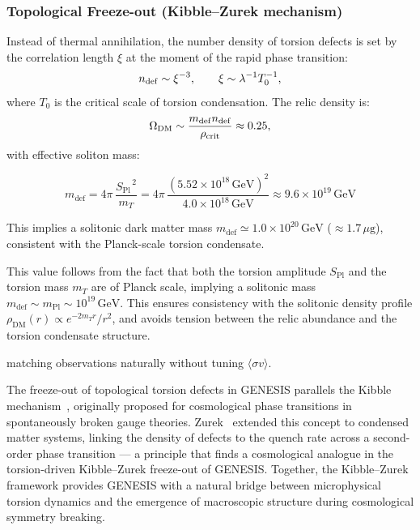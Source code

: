 \documentclass{article}
\newcommand{\Splanck}{\ensuremath{S_{\mathrm{Pl}}}}
\begin{document}
\subsubsection{Topological Freeze-out (Kibble–Zurek mechanism)}
\label{app:kibble-zurek}

Instead of thermal annihilation, the number density of torsion defects is set by the correlation length $\xi$ at the moment of the rapid phase transition:
\begin{equation}
  n_{\rm def} \sim \xi^{-3},
  \qquad
  \xi \sim \lambda^{-1} T_0^{-1},
\end{equation}
where $T_0$ is the critical scale of torsion condensation. The relic density is:
\begin{equation}
  \Omega_{\rm DM} \sim \frac{m_{\rm def} n_{\rm def}}{\rho_{\rm crit}}
  \approx 0.25,
\end{equation}
with effective soliton mass:


\begin{equation}
m_{\text{def}} = 4\pi\,\frac{\Splanck^{\,2}}{m_T}
= 4\pi\,\frac{(5.52\times10^{18}\,\mathrm{GeV})^2}{4.0\times10^{18}\,\mathrm{GeV}}
\approx 9.6\times10^{19}\,\mathrm{GeV}
\end{equation}

This implies a solitonic dark matter mass $m_{\text{def}} \simeq 1.0\times10^{20}\,\mathrm{GeV}$ ($\approx 1.7\,\mu\mathrm{g}$), consistent with the Planck-scale torsion condensate.



\begin{tcolorbox}[colback=gray!5!white, colframe=black!30, title=Consistency Note]
This value follows from the fact that both the torsion amplitude $S_{\text{Pl}}$ and the torsion mass $m_T$ are of Planck scale,
implying a solitonic mass $m_{\text{def}} \sim m_{\text{Pl}} \sim 10^{19}\,\mathrm{GeV}$.
This ensures consistency with the solitonic density profile $\rho_{\text{DM}}(r) \propto e^{-2m_T r}/r^2$,
and avoids tension between the relic abundance and the torsion condensate structure.
\end{tcolorbox}


matching observations naturally without tuning $\langle\sigma v\rangle$.

The freeze-out of topological torsion defects in GENESIS parallels the Kibble mechanism~\cite{kibble1976}, originally proposed for cosmological phase transitions in spontaneously broken gauge theories.
Zurek~\cite{zurek1985} extended this concept to condensed matter systems, linking the density of defects to the quench rate across a second-order phase transition — a principle that finds a cosmological analogue in the torsion-driven Kibble–Zurek freeze-out of GENESIS.
Together, the Kibble–Zurek framework provides GENESIS with a natural bridge between microphysical torsion dynamics and the emergence of macroscopic structure during cosmological symmetry breaking.
\end{document}

